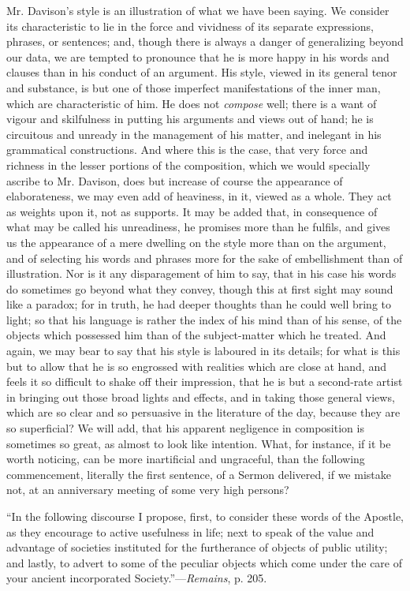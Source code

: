 Mr. Davison's style is an illustration of what we
have been saying. We consider its characteristic to lie in the force
and vividness of its separate expressions, phrases, or sentences; and,
though there is always a danger of generalizing beyond our data, we
are tempted to pronounce that he is more happy in his words and
clauses than in his conduct of an argument. His style, viewed in its
general tenor and substance, is but one of those imperfect
manifestations of the inner man, which are characteristic of him. He
does not \emph{compose} well; there is a want of vigour and skilfulness in
putting his arguments and views out of hand; he is circuitous and
unready in the management of his matter, and inelegant in his
grammatical constructions. And where this is the case, that very force
and richness in the lesser portions of the composition, which we would
specially ascribe to Mr. Davison, does but increase of course the
appearance of elaborateness, we may even add of heaviness, in it,
viewed as a whole. They act as weights upon it, not as supports.
It may be added that, in consequence of what may be called his
unreadiness, he promises more than he fulfils, and gives us the
appearance of a mere dwelling on the style more than on the argument,
and of selecting his words and phrases more for the sake of
embellishment than of illustration. Nor is it any disparagement of him
to say, that in his case his words do sometimes go beyond what they
convey, though this at first sight may sound like a paradox; for in
truth, he had deeper thoughts than he could well bring to light; so
that his language is rather the index of his mind than of his sense,
of the objects which possessed him than of the subject-matter which he
treated. And again, we may bear to say that his style is laboured in
its details; for what is this but to allow that he is so engrossed
with realities which are close at hand, and feels it so difficult to
shake off their impression, that he is but a second-rate artist in
bringing out those broad lights and effects, and in taking those
general views, which are so clear and so persuasive in the literature
of the day, because they are so superficial? We will add, that his
apparent negligence in composition is sometimes so great, as almost to
look like intention. What, for instance, if it be worth noticing, can
be more inartificial and ungraceful, than the following commencement,
literally the first sentence, of a Sermon delivered, if we mistake
not, at an anniversary meeting of some very high persons?

``In
the following discourse I propose, first, to consider these words of
the Apostle, as they encourage to active usefulness in life; next to
speak of the value and advantage of societies instituted for the
furtherance of objects of public utility; and lastly, to advert to
some of the peculiar objects which come under the care of your ancient
incorporated Society.''—\emph{Remains}, p. 205.


